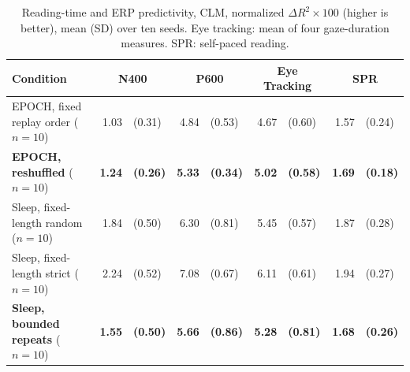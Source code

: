 \begin{table}[h]
\centering
\begin{tabular}{l@{\quad}r@{\,}l@{\quad}r@{\,}l@{\quad}r@{\,}l@{\quad}r@{\,}l}
\toprule
Condition & \multicolumn{2}{c}{N400} & \multicolumn{2}{c}{P600} & \multicolumn{2}{c}{Eye Tracking} & \multicolumn{2}{c}{SPR} \\
\midrule
EPOCH, fixed replay order ($n=10$) & 1.03 & (0.31) & 4.84 & (0.53) & 4.67 & (0.60) & 1.57 & (0.24) \\
\textbf{EPOCH, reshuffled} ($n=10$) & \textbf{1.24} & \textbf{(0.26)} & \textbf{5.33} & \textbf{(0.34)} & \textbf{5.02} & \textbf{(0.58)} & \textbf{1.69} & \textbf{(0.18)} \\
Sleep, fixed-length random ($n=10$) & 1.84 & (0.50) & 6.30 & (0.81) & 5.45 & (0.57) & 1.87 & (0.28) \\
Sleep, fixed-length strict ($n=10$) & 2.24 & (0.52) & 7.08 & (0.67) & 6.11 & (0.61) & 1.94 & (0.27) \\
\textbf{Sleep, bounded repeats} ($n=10$) & \textbf{1.55} & \textbf{(0.50)} & \textbf{5.66} & \textbf{(0.86)} & \textbf{5.28} & \textbf{(0.81)} & \textbf{1.68} & \textbf{(0.26)} \\
\bottomrule
\end{tabular}
\caption{Reading-time and ERP predictivity, CLM, normalized $\Delta R^2 \times 100$ (higher is better), mean (SD) over ten seeds. Eye tracking: mean of four gaze-duration measures. SPR: self-paced reading.}
\label{tab:psychometrics}
\end{table}
